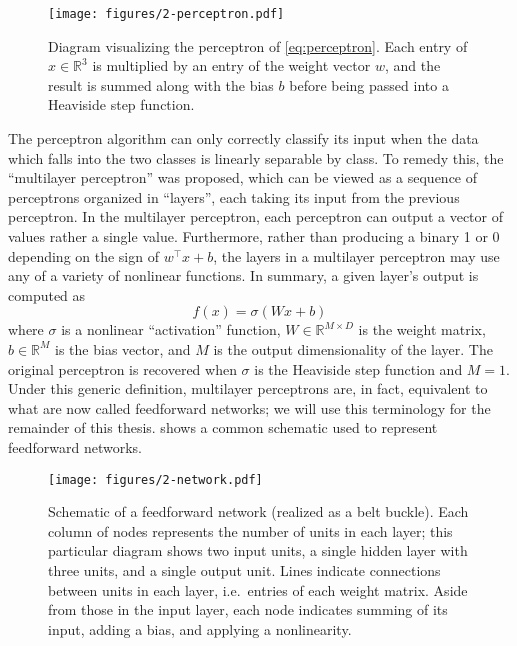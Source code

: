 \begin{figure}
  \centering
  \texttt{[image: figures/2-perceptron.pdf]}
  \caption[Visualization of a perceptron]{Diagram visualizing the perceptron of \cref{eq:perceptron}.
  Each entry of $x \in \mathbb{R}^3$ is multiplied by an entry of the weight vector $w$, and the result is summed along with the bias $b$ before being passed into a Heaviside step function.}
  \label{fig:perceptron}
\end{figure}

The perceptron algorithm can only correctly classify its input when the data which falls into the two classes is linearly separable by class.
To remedy this, the ``multilayer perceptron'' was proposed, which can be viewed as a sequence of perceptrons organized in ``layers'', each taking its input from the previous perceptron.
In the multilayer perceptron, each perceptron can output a vector of values rather a single value.
Furthermore, rather than producing a binary 1 or 0 depending on the sign of $w^\top x + b$, the layers in a multilayer perceptron may use any of a variety of nonlinear functions.
In summary, a given layer's output is computed as
\begin{equation}
f(x) = \sigma(W x + b)
\end{equation}
where $\sigma$ is a nonlinear ``activation'' function, $W \in \mathbb{R}^{M \times D}$ is the weight matrix, $b \in \mathbb{R}^M$ is the bias vector, and $M$ is the output dimensionality of the layer.
The original perceptron is recovered when $\sigma$ is the Heaviside step function and $M = 1$.
Under this generic definition, multilayer perceptrons are, in fact, equivalent to what are now called feedforward networks; we will use this terminology for the remainder of this thesis.
 shows a common schematic used to represent feedforward networks.

\begin{figure}
  \centering
  \texttt{[image: figures/2-network.pdf]}
  \caption[Schematic of a feedforward network]{Schematic of a feedforward network (realized as a belt buckle).
  Each column of nodes represents the number of units in each layer; this particular diagram shows two input units, a single hidden layer with three units, and a single output unit.
  Lines indicate connections between units in each layer, i.e.\ entries of each weight matrix.
  Aside from those in the input layer, each node indicates summing of its input, adding a bias, and applying a nonlinearity.}
  \label{fig:network}
\end{figure}

